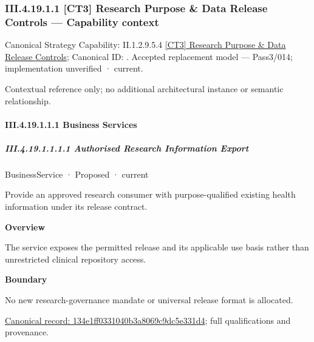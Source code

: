 \subsubsection*{III.4.19.1.1 [CT3] Research Purpose \& Data Release Controls — Capability context}
\label{navigation:III.4.19.1.1}

{\small Canonical Strategy Capability: II.1.2.9.5.4 \hyperref[element:6ca69337ffe1477292944524be0693c9]{[CT3] Research Purpose \& Data Release Controls}; Canonical ID: \texttt{}. Accepted replacement model — Pass3/014; implementation unverified · current.}\par
Contextual reference only; no additional architectural instance or semantic relationship.\par
\paragraph*{III.4.19.1.1.1 Business Services}
\label{navigation:III.4.19.1.1.1}

\subparagraph*{III.4.19.1.1.1.1 Authorised Research Information Export}
\label{navigation:III.4.19.1.1.1.1}

\label{element:134e1ff0331040b3a8069c9dc5e331d4}
{\small BusinessService · Proposed · current}\par

Provide an approved research consumer with purpose-qualified existing health information under its release contract.



\textbf{Overview}



The service exposes the permitted release and its applicable use basis rather than unrestricted clinical repository access.



\textbf{Boundary}



No new research-governance mandate or universal release format is allocated.


{\footnotesize \href{../../../../../../../continuum/business/business-service/134e1ff0331040b3a8069c9dc5e331d4.md}{Canonical record: 134e1ff0331040b3a8069c9dc5e331d4}; full qualifications and provenance.}\par
